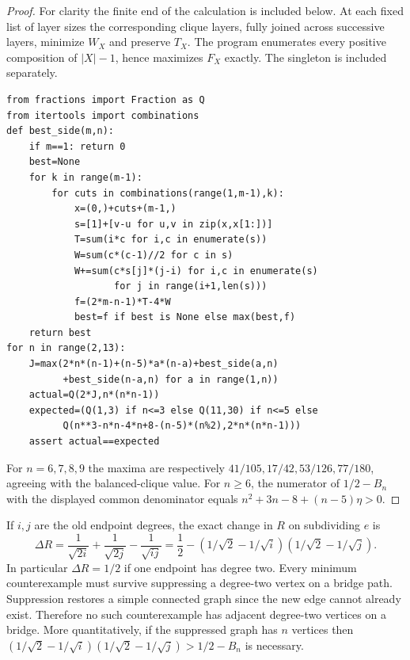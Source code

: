 \documentclass[11pt,a4paper]{article}
\begin{document}
\begin{proof}
For clarity the finite end of the calculation is included below.
At each fixed list of layer sizes the corresponding clique layers,
fully joined across successive layers, minimize $W_X$ and preserve
$T_X$. The program enumerates every positive composition of $|X|-1$,
hence maximizes $F_X$ exactly. The singleton is included separately.
\begin{verbatim}
from fractions import Fraction as Q
from itertools import combinations
def best_side(m,n):
    if m==1: return 0
    best=None
    for k in range(m-1):
        for cuts in combinations(range(1,m-1),k):
            x=(0,)+cuts+(m-1,)
            s=[1]+[v-u for u,v in zip(x,x[1:])]
            T=sum(i*c for i,c in enumerate(s))
            W=sum(c*(c-1)//2 for c in s)
            W+=sum(c*s[j]*(j-i) for i,c in enumerate(s)
                   for j in range(i+1,len(s)))
            f=(2*m-n-1)*T-4*W
            best=f if best is None else max(best,f)
    return best
for n in range(2,13):
    J=max(2*n*(n-1)+(n-5)*a*(n-a)+best_side(a,n)
          +best_side(n-a,n) for a in range(1,n))
    actual=Q(2*J,n*(n*n-1))
    expected=(Q(1,3) if n<=3 else Q(11,30) if n<=5 else
          Q(n**3-n*n-4*n+8-(n-5)*(n%2),2*n*(n*n-1)))
    assert actual==expected
\end{verbatim}
For $n=6,7,8,9$ the maxima are respectively $41/105,17/42,53/126,77/180$,
agreeing with the balanced-clique value. For $n\ge6$, the numerator of
$1/2-B_n$ with the displayed common denominator equals
$n^2+3n-8+(n-5)\eta>0$.
\end{proof}
If $i,j$ are the old endpoint degrees, the exact change in $R$ on
subdividing $e$ is
\[
 \Delta R=\frac1{\sqrt{2i}}+\frac1{\sqrt{2j}}-\frac1{\sqrt{ij}}
 =\frac12-(1/\sqrt2-1/\sqrt i)(1/\sqrt2-1/\sqrt j).
\]
In particular $\Delta R=1/2$ if one endpoint has degree two.
Every minimum counterexample must survive suppressing a degree-two
vertex on a bridge path. Suppression restores a simple connected graph
since the new edge cannot already exist. Therefore no such counterexample
has adjacent degree-two vertices on a bridge. More quantitatively,
if the suppressed graph has $n$ vertices then
$(1/\sqrt2-1/\sqrt i)(1/\sqrt2-1/\sqrt j)>1/2-B_n$ is necessary.
\end{document}
